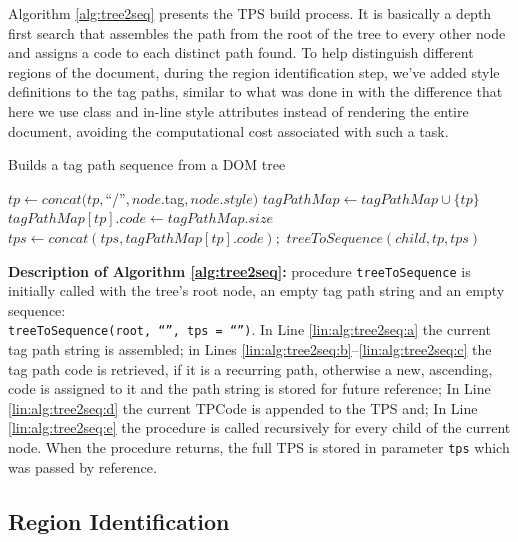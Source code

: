 \documentclass{vldb}
\begin{document}
Algorithm \ref{alg:tree2seq} presents the TPS build process.
It is basically a depth first search that assembles the path from the root of
the tree to every other node and assigns a code to each distinct path found. To
help distinguish different regions of the document, during the region
identification step, we've added style definitions to the tag paths, similar to
what was done in \cite{grigalis2013towards} with the difference that here we use class
and in-line style attributes instead of rendering the entire document, avoiding
the computational cost associated with such a task.

\begin{algorithm}[h]
\caption{Builds a tag path sequence from a DOM tree}
\label{alg:tree2seq}
\begin{algorithmic}[1]
\State $tp \leftarrow
concat(tp,$``/''$,node.$tag$,node.style)$\label{lin:alg:tree2seq:a}
 \label{lin:alg:tree2seq:b}
\State $tagPathMap \leftarrow tagPathMap \cup \{tp\}$ 
\State $tagPathMap[tp].code \leftarrow tagPathMap.size$ 
\EndIf \label{lin:alg:tree2seq:c}
\State $tps \leftarrow
concat(tps,tagPathMap[tp].code);$\label{lin:alg:tree2seq:d}
\State $treeToSequence(child,tp,tps)$\label{lin:alg:tree2seq:e} 
\EndFor 
\EndProcedure
\end{algorithmic}
\end{algorithm}

\textbf{Description of Algorithm \ref{alg:tree2seq}:} procedure
\texttt{treeToSequence} is initially called with the tree's root node, an empty
tag path string and an empty sequence: \\\texttt{treeToSequence}\texttt{(root,
``'', tps = ``'')}. In Line \ref{lin:alg:tree2seq:a} the current tag path string is
assembled; in Lines \ref{lin:alg:tree2seq:b}--\ref{lin:alg:tree2seq:c} the tag
path code is retrieved, if it is a recurring path, otherwise a new, ascending,
code is assigned to it and the path string is stored for future reference; In
Line \ref{lin:alg:tree2seq:d} the current TPCode is appended to the TPS and; In
Line \ref{lin:alg:tree2seq:e} the procedure is called recursively for every
child of the current node. When the procedure returns, the full TPS is stored in
parameter \texttt{tps} which was passed by reference.

\subsection{Region Identification}\label{ss:regi}
\end{document}
